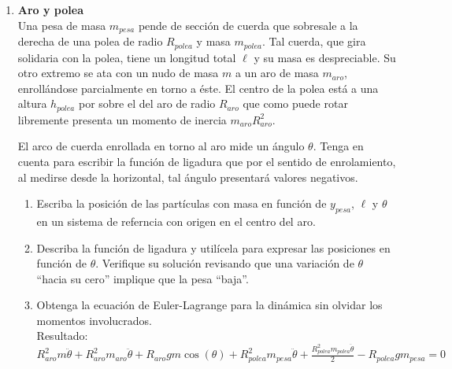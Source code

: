 \documentclass[11pt, spanish, a4paper, twoside]{article}
\begin{document}
\begin{enumerate}
	\item 
	\begin{minipage}[t][6cm]{0.57\textwidth}
		\textbf{Aro y polea}\\
		Una pesa de masa \(m_{pesa}\) pende de sección de cuerda que sobresale a la derecha de una polea de radio \(R_{polea}\) y masa \(m_{polea}\).
		Tal cuerda, que gira solidaria con la polea, tiene un longitud total \(\ell\) y su masa es despreciable.
		Su otro extremo se ata con un nudo de masa \(m\) a un aro de masa \(m_{aro}\), enrollándose parcialmente en torno a éste.
		El centro de la polea está a una altura \(h_{polea}\) por sobre el del aro de radio \(R_{aro}\) que como puede rotar libremente presenta un momento de inercia \(m_{aro} R_{aro}^2\).
		
		El arco de cuerda enrollada en torno al aro mide un ángulo \(\theta\).
		Tenga en cuenta para escribir la función de ligadura que por el sentido de enrolamiento, al medirse desde la horizontal, tal ángulo presentará valores negativos.
	\end{minipage}
	\begin{minipage}[c][1.5cm][t]{0.2\textwidth}
		
	\end{minipage}
	\begin{enumerate}
		\item Escriba la posición de las partículas con masa en función de \(y_{pesa}\), \(\ell\) y \(\theta\) en un sistema de referncia con origen en el centro del aro.
		\item Describa la función de ligadura y utilícela para expresar las posiciones en función de \(\theta\).
		Verifique su solución revisando que una variación de \(\theta\) ``hacia su cero'' implique que la pesa ``baja''. 
		\item Obtenga la ecuación de Euler-Lagrange para la dinámica sin olvidar los momentos involucrados.\\
		Resultado:
		\(
		R_{aro}^{2} m \ddot{\theta} + R_{aro}^{2} m_{aro} \ddot{\theta} + R_{aro} g m \cos{\left(\theta \right)} + R_{polea}^{2} m_{pesa} \ddot{\theta} + \frac{R_{polea}^{2} m_{polea} \ddot{\theta}}{2} - R_{polea} g m_{pesa} = 0
		\)
	\end{enumerate}



\end{enumerate}
\end{document}
